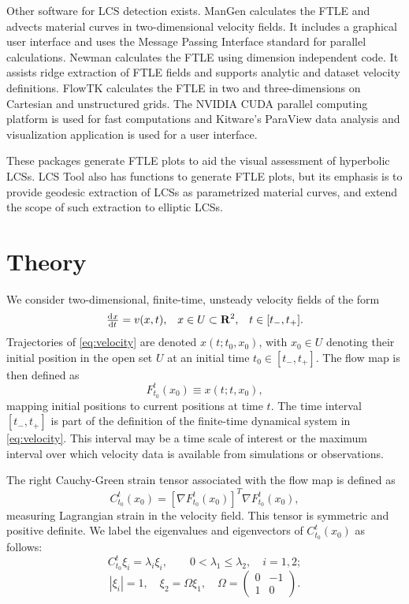 \documentclass[5p]{elsarticle}
\begin{document}
Other software for LCS detection exists.
ManGen\citep{lekien03:_time} calculates the FTLE and advects material curves in two-dimensional velocity fields.
It includes a graphical user interface and uses the Message Passing Interface standard for parallel calculations.
Newman\citep{toit10:_trans} calculates the FTLE using dimension independent code.
It assists ridge extraction of FTLE fields and supports analytic and dataset velocity definitions.
FlowTK\citep{ameli14:_devel_effic_flexib_pipel_lagran} calculates the FTLE in two and three-dimensions on Cartesian and unstructured grids.
The NVIDIA CUDA parallel computing platform is used for fast computations and Kitware's ParaView data analysis and visualization application is used for a user interface.

These packages generate FTLE plots to aid the visual assessment of hyperbolic LCSs.
LCS Tool also has functions to generate FTLE plots, but its emphasis is to provide geodesic extraction of LCSs as parametrized material curves, and extend the scope of such extraction to elliptic LCSs.

\section{Theory}

We consider two-dimensional, finite-time, unsteady velocity fields of the form
\begin{align}
\od{x}{t} = v(x,t), && x \in U \subset \mathbf R^2, && t \in [t_-,t_+].
\label{eq:velocity}
\end{align}
Trajectories of \cref{eq:velocity} are denoted $x(t;t_0,x_0)$, with $x_0 \in U$ denoting their initial position in the open set $U$ at an initial time $t_0 \in [t_-,t_+]$. The flow map is then defined as
\[
F_{t_0}^t(x_0) \equiv x(t;t,x_0),
\]
mapping initial positions to current positions at time $t$. The time interval $[t_-,t_+]$ is part of the definition of the finite-time dynamical system in \cref{eq:velocity}. This interval may be a time scale of interest or the maximum interval over which velocity data is available from simulations or observations.

The right Cauchy-Green strain tensor associated with the flow map is defined as
\begin{equation}
C_{t_0}^t(x_0) = \left[\nabla F_{t_0}^t(x_0)\right]^T \nabla F_{t_0}^t(x_0),
\label{eq:CG}
\end{equation}
measuring Lagrangian strain in the velocity field. This tensor is symmetric and positive definite\citep{truesdell04}. We label the eigenvalues and eigenvectors of $C_{t_0}^t(x_0)$ as follows:
\[
C_{t_0}^t \xi_i = \lambda_i \xi_i, \qquad 0 < \lambda_1 \leq \lambda_2, \quad i = 1,2;
\]
\begin{equation}
\left|\xi_i\right| = 1, \quad \xi_2 = \Omega \xi_1, \quad \Omega = \left(
\begin{array}{rr}
0 & -1\\
1 & 0
\end{array}
\right).
\label{eq:CG_invariants}
\end{equation}
\end{document}
